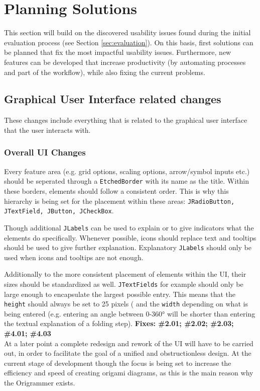 
\section{Planning Solutions}
\label{sec:planningSolutions}

This section will build on the discovered usability issues found during the initial evaluation process (see Section \ref{sec:evaluation}). On this basis, first solutions can be planned that fix the most impactful usability issues. Furthermore, new features can be developed that increase productivity (by automating processes and part of the workflow), while also fixing the current problems.


\subsection{Graphical User Interface related changes}

These changes include everything that is related to the graphical user interface that the user interacts with.

\subsubsection{Overall UI Changes}
Every feature area (e.g. grid options, scaling options, arrow/symbol inputs etc.) should be seperated through a \texttt{EtchedBorder} with its name as the title. Within these borders, elements should follow a consistent order. This is why this hierarchy is being set for the placement within these areas: \texttt{JRadioButton, JTextField, JButton, JCheckBox}.

Though additional \texttt{JLabels} can be used to explain or to give indicators what the elements do specifically. Whenever possible, icons should replace text and tooltips should be used to give further explanation. Explanatory \texttt{JLabels} should only be used when icons and tooltips are not enough.

Additionally to the more consistent placement of elements within the UI, their sizes should be standardized as well. \texttt{JTextFields} for example should only be large enough to encapsulate the largest possible entry. This means that the \texttt{height} should always be set to 25 pixels ( and the \texttt{width} depending on what is being entered (e.g. entering an angle between 0-360° will be shorter than entering the textual explanation of a folding step).
\newline
\textbf{Fixes: \#2.01; \#2.02; \#2.03; \#4.01; \#4.03}\\
\newline
At a later point a complete redesign and rework of the UI will have to be carried out, in order to facilitate the goal of a unified and obstructionless design. At the current stage of development though the focus is being set to increase the efficiency and speed of creating origami diagrams, as this is the main reason why the Origrammer exists.

